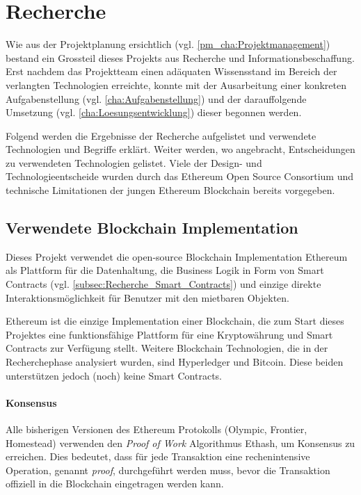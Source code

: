 \section{Recherche}
\label{sec:Recherche}
Wie aus der Projektplanung ersichtlich (vgl. \ref{pm_cha:Projektmanagement}) bestand ein Grossteil dieses Projekts aus Recherche und Informationsbeschaffung. Erst nachdem das Projektteam einen adäquaten Wissensstand im Bereich der verlangten Technologien erreichte, konnte mit der Ausarbeitung einer konkreten Aufgabenstellung (vgl. \ref{cha:Aufgabenstellung}) und der darauffolgende Umsetzung (vgl. \ref{cha:Loesungsentwicklung}) dieser begonnen werden.

Folgend werden die Ergebnisse der Recherche aufgelistet und verwendete Technologien und Begriffe erklärt. Weiter werden, wo angebracht, Entscheidungen zu verwendeten Technologien gelistet. Viele der Design- und Technologieentscheide wurden durch das Ethereum Open Source Consortium und technische Limitationen der jungen Ethereum Blockchain bereits vorgegeben.\cite[Wiki, Wiki/Mobile Introduction, Wiki/Developer's Guide, Wiki/Private Network]{go-ethereum}\cite{github.com/ethereum}

\subsection{Verwendete Blockchain Implementation}
Dieses Projekt verwendet die open-source Blockchain Implementation Ethereum als Plattform für die Datenhaltung, die Business Logik in Form von Smart Contracts (vgl. \ref{subsec:Recherche_Smart_Contracts}) und einzige direkte Interaktionsmöglichkeit für Benutzer mit den mietbaren Objekten.

Ethereum ist die einzige Implementation einer Blockchain, die zum Start dieses Projektes eine funktionsfähige Plattform für eine Kryptowährung und Smart Contracts zur Verfügung stellt. Weitere Blockchain Technologien, die in der Recherchephase analysiert wurden, sind Hyperledger und Bitcoin. Diese beiden unterstützen jedoch (noch) keine Smart Contracts.\cite{ethereum.org}\cite[welcome]{wiki.hyperledger.org}

\paragraph{Konsensus}
Alle bisherigen Versionen des Ethereum Protokolls (Olympic, Frontier, Homestead) verwenden den \emph{Proof of Work} Algorithmus Ethash, um Konsensus zu erreichen. Dies bedeutet, dass für jede Transaktion eine rechenintensive Operation, genannt \emph{proof}, durchgeführt werden muss, bevor die Transaktion offiziell in die Blockchain eingetragen werden kann.\cite{Ethash}

